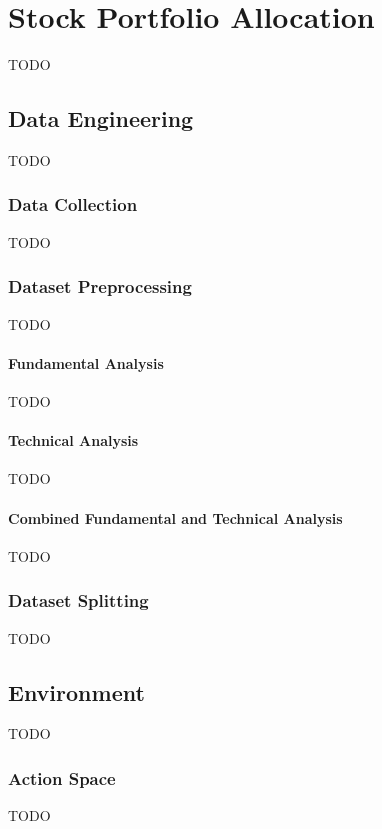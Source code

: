 \documentclass[../xlapes02]{subfiles}
\begin{document}
    \chapter{Stock Portfolio Allocation}\label{sec:stock-portfolio-allocation}
    TODO


    \section{Data Engineering}\label{ch:data-engineering}
    TODO

    \subsection{Data Collection}\label{sec:data-collection}
    TODO

    \subsection{Dataset Preprocessing}\label{sec:dataset-preprocessing}
    TODO

    \subsubsection{Fundamental Analysis}\label{sec:fundamental-analysis}
    TODO

    \subsubsection{Technical Analysis}\label{sec:technical-analysis}
    TODO

    \subsubsection{Combined Fundamental and Technical Analysis}\label{sec:combined-fundamental-and-technical-analysis}
    TODO

    \subsection{Dataset Splitting}\label{sec:dataset-splitting}
    TODO


    \section{Environment}\label{sec:environment}
    TODO

    \subsection{Action Space}\label{subsec:action-space}
    TODO
\end{document}
